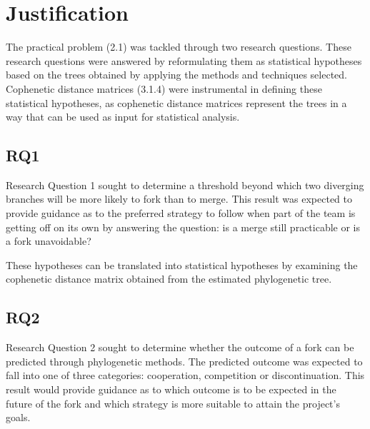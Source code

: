 \section{Justification}
The practical problem (2.1) was tackled through two research questions. These research questions were answered by reformulating them as statistical hypotheses based on the trees obtained by applying the methods and techniques selected. Cophenetic distance matrices (3.1.4) were instrumental in defining these statistical hypotheses, as cophenetic distance matrices represent the trees in a way that can be used as input for statistical analysis.

\subsection{RQ1}
Research Question 1 sought to determine a threshold beyond which two diverging branches will be more likely to fork than to merge. This result was expected to provide guidance as to the preferred strategy to follow when part of the team is getting off on its own by answering the question: is a merge still practicable or is a fork unavoidable?



\noindent
These hypotheses can be translated into statistical hypotheses by examining the cophenetic distance matrix obtained from the estimated phylogenetic tree.



\subsection{RQ2}
Research Question 2 sought to determine whether the outcome of a fork can be predicted through phylogenetic methods. The predicted outcome was expected to fall into one of three categories: cooperation, competition or discontinuation. This result would provide guidance as to which outcome is to be expected in the future of the fork and which strategy is more suitable to attain the project's goals. 

